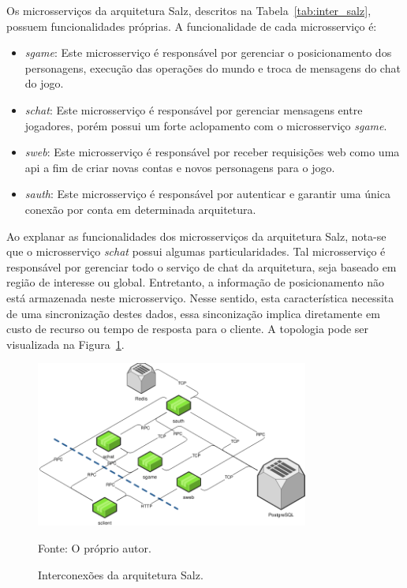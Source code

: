 Os microsserviços da arquitetura Salz, descritos na Tabela~\ref{tab:inter_salz}, possuem funcionalidades próprias.
%
A funcionalidade de cada microsserviço é:



\begin{itemize}
  \item \textit{sgame}: Este microsserviço é responsável por gerenciar o posicionamento dos personagens, execução das operações do mundo e troca de mensagens do chat do jogo.
  \item \textit{schat}: Este microsserviço é responsável por gerenciar mensagens entre jogadores, porém possui um forte aclopamento com o microsserviço \textit{sgame}.
  \item \textit{sweb}: Este microsserviço é responsável por receber requisições web como uma \ac{api} a fim de criar novas contas e novos personagens para o jogo.
  \item \textit{sauth}: Este microsserviço é responsável por autenticar e garantir uma única conexão por conta em determinada arquitetura.
\end{itemize}



Ao explanar as funcionalidades dos microsserviços da arquitetura Salz, nota-se que o microsserviço \textit{schat} possui algumas particularidades.
%
Tal microsserviço é responsável por gerenciar todo o serviço de chat da arquitetura, seja baseado em região de interesse ou global.
%
Entretanto, a informação de posicionamento não está armazenada neste microsserviço.
%
Nesse sentido, esta característica necessita de uma sincronização destes dados, essa sinconização implica diretamente em custo de recurso ou tempo de resposta para o cliente.
%
A topologia pode ser visualizada na Figura~\ref{fig:interconexao_salz}.



\begin{figure}[htb!]
  \caption{Interconexões da arquitetura Salz.}
  \label{fig:interconexao_salz}
  \includegraphics[width=0.8\textwidth]{figuras/interconexoes/salz.png}
  \centering

  Fonte: O próprio autor.
\end{figure}



